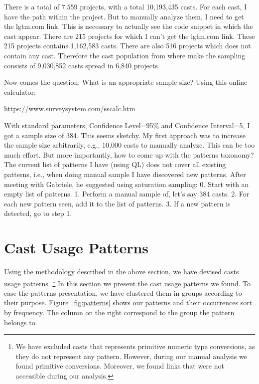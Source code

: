 There is a total of $7.559$ projects, with a total 10,193,435 casts.
For each cast, I have the path within the project.
But to manually analyze them, I need to get the lgtm.com link.
This is necessary to actually see the code snippet in which the cast appear.
There are 215 projects for which I can’t get the lgtm.com link.
These 215 projects contains 1,162,583 casts.
There are also 516 projects which does not contain any cast.
Therefore the cast population from where make the sampling consists of
9,030,852 casts spread in 6,840 projects.

Now comes the question: What is an appropriate sample size?
Using this online calculator:

https://www.surveysystem.com/sscalc.htm

With standard parameters, Confidence Level=95\% and Confidence Interval=5,
I got a sample size of 384.
This seems sketchy.
My first approach was to increase the sample size arbitrarily,
e.g., 10,000 casts to manually analyze.
This can be too much effort.
But more importantly, how to come up with the patterns taxonomy?
The current list of patterns I have (using QL) does not cover all
existing patterns, i.e.,
when doing manual sample I have discovered new patterns.
After meeting with Gabriele, he suggested using saturation sampling:
0. Start with an empty list of patterns.
1. Perform a manual sample of, let’s say 384 casts.
2. For each new pattern seen, add it to the list of patterns.
3. If a new pattern is detected, go to step 1.

\section{Cast Usage Patterns}
\label{sec:patterns}

Using the methodology described in the above section, we have devised \npattern{} casts usage patterns.%
\footnote{We have excluded casts that represents primitive numeric type conversions, as they do not represent any pattern.
However, during our manual analysis we found \nprim{} primitive conversions.
Moreover, we found \nbrokenlinks{} links that were not accessible during our analysis.}
In this section we present the cast usage patterns we found.
To ease the patterns presentation, we have clustered them in \ngroup{} groups according to their purpose.
Figure~\ref{fig:patterns} shows our patterns and their occurrences sort by frequency.
The column on the right correspond to the group the pattern belongs to.


